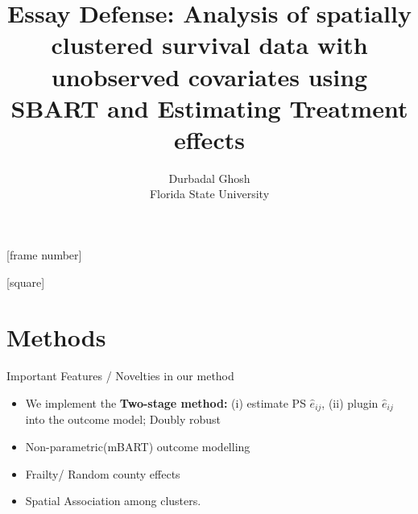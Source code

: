 [frame number]{}


[square]





\newcommand{\alertb}[1]{{\color{alertblue}#1}}
\ifLuaTeX
  \usepackage{selnolig}  %
\fi
{}

\title{Essay Defense: Analysis of spatially clustered survival data with unobserved covariates  using SBART and Estimating Treatment effects}
\author{Durbadal Ghosh\\
Florida State University}
\date{}


\frame{\titlepage}
\frame{\tableofcontents}


\section{Methods}

\begin{frame}{Important Features / Novelties in our method}
\begin{itemize}
    \item We implement the \textbf{Two-stage method:} (i) estimate PS $\hat{e}_{ij}$, (ii) plugin $\hat{e}_{ij}$ into the outcome model; Doubly robust
    \item Non-parametric(mBART) outcome modelling
    \item Frailty/ Random county effects
    \item Spatial Association among clusters.
    
\end{itemize}
    
\end{frame}

